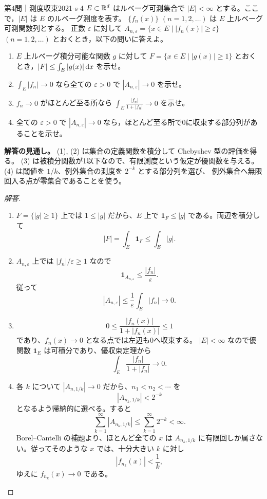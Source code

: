 \begin{problem}{第4問｜測度収束}{2021-s-4}
$E\subset\mathbb{R}^d$ はルベーグ可測集合で $|E|<\infty$ とする。ここで，$|E|$ は $E$ のルベーグ測度を表す。
$\{f_n(x)\}$ $(n=1,2,\ldots)$ は $E$ 上ルベーグ可測関数列とする。
正数 $\varepsilon$ に対して $A_{n,\varepsilon}=\{x\in E\mid|f_n(x)|\ge\varepsilon\}$ $(n=1,2,\ldots)$ とおくとき，以下の問いに答えよ。
\begin{enumerate}
  \item[(1)] $E$ 上ルベーグ積分可能な関数 $g$ に対して $F=\{x\in E\mid|g(x)|\ge1\}$ とおくとき，$|F|\le\int_E|g(x)|\,\mathrm{d} x$ を示せ。
  \item[(2)] $\int_E|f_n|\to0$ なら全ての $\varepsilon>0$ で $|A_{n,\varepsilon}|\to0$ を示せ。
  \item[(3)] $f_n\to0$ がほとんど至る所なら $\displaystyle\int_E\frac{|f_n|}{1+|f_n|}\to0$ を示せ。
  \item[(4)] 全ての $\varepsilon>0$ で $|A_{n,\varepsilon}|\to0$ なら，ほとんど至る所で0に収束する部分列があることを示せ。
\end{enumerate}
\end{problem}
\begin{memo*}
\textbf{解答の見通し。}
(1), (2) は集合の定義関数を積分して Chebyshev 型の評価を得る。
(3) は被積分関数が1以下なので、有限測度という仮定が優関数を与える。
(4) は閾値を $1/k$、例外集合の測度を $2^{-k}$ とする部分列を選び、
例外集合へ無限回入る点が零集合であることを使う。
\end{memo*}
\begin{proof}[解答]
\begin{enumerate}
\item[(1)] $F=\{|g|\ge1\}$ 上では $1\le|g|$ だから、$E$ 上で
$\mathbf1_F\le|g|$ である。両辺を積分して
\[
|F|=\int_E\mathbf1_F\le\int_E|g|.
\]

\item[(2)] $A_{n,\varepsilon}$ 上では $|f_n|/\varepsilon\ge1$ なので
\[
\mathbf1_{A_{n,\varepsilon}}
\le\frac{|f_n|}{\varepsilon}.
\]
従って
\[
|A_{n,\varepsilon}|
\le\frac1\varepsilon\int_E|f_n|\longrightarrow0.
\]

\item[(3)]
\[
0\le\frac{|f_n(x)|}{1+|f_n(x)|}\le1
\]
であり、$f_n(x)\to0$ となる点では左辺も0へ収束する。
$|E|<\infty$ なので優関数 $\mathbf1_E$ は可積分であり、優収束定理から
\[
\int_E\frac{|f_n|}{1+|f_n|}\longrightarrow0.
\]

\item[(4)] 各 $k$ について $|A_{n,1/k}|\to0$ だから、$n_1<n_2<\cdots$ を
\[
|A_{n_k,1/k}|<2^{-k}
\]
となるよう帰納的に選べる。すると
\[
\sum_{k=1}^\infty|A_{n_k,1/k}|
\le\sum_{k=1}^\infty2^{-k}<\infty.
\]
Borel--Cantelli の補題より、ほとんど全ての $x$ は
$A_{n_k,1/k}$ に有限回しか属さない。従ってそのような $x$ では、十分大きい $k$ に対し
\[
|f_{n_k}(x)|<\frac1k,
\]
ゆえに $f_{n_k}(x)\to0$ である。
\end{enumerate}
\end{proof}

